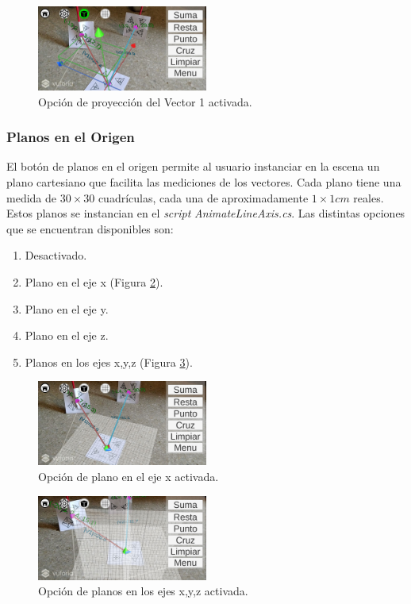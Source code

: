 \begin{figure}[hbt!]
\centering
\includegraphics[width=0.5\textwidth]{figuras/vectores/Proyeccion.png}
\caption{\label{fig:vec_opcion_proyeccion}Opción de proyección del Vector 1 activada.}
\end{figure}
\FloatBarrier

\subsubsection{Planos en el Origen}
El botón de planos en el origen permite al usuario instanciar en la escena un plano cartesiano que facilita las mediciones de los vectores. Cada plano tiene una medida de $30\times 30$ cuadrículas, cada una de aproximadamente $1\times 1cm$ reales. Estos planos se instancian en el \textit{script} \textit{AnimateLineAxis.cs}. Las distintas opciones que se encuentran disponibles son:

\begin{enumerate}
    \item Desactivado.
    \item Plano en el eje x (Figura \ref{fig:vec_opcion_planos_x}).
    \item Plano en el eje y.
    \item Plano en el eje z.
    \item Planos en los ejes x,y,z (Figura \ref{fig:vec_opcion_planos_xyz}).
\end{enumerate}

\begin{figure}[hbt!]
\centering
\includegraphics[width=0.5\textwidth]{figuras/vectores/Planos1.png}
\caption{\label{fig:vec_opcion_planos_x}Opción de plano en el eje x activada.}
\end{figure}

\begin{figure}[hbt!]
\centering
\includegraphics[width=0.5\textwidth]{figuras/vectores/Planos2.png}
\caption{\label{fig:vec_opcion_planos_xyz}Opción de planos en los ejes x,y,z activada.}
\end{figure}
\FloatBarrier

